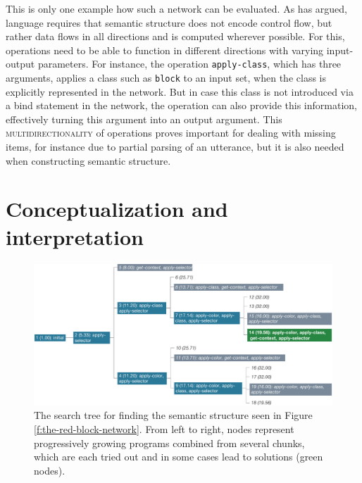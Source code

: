 This is only one example how such a network can be evaluated. 
As \cite{steels2000emergence} has argued,
language requires that semantic structure does not encode control flow, but rather 
data flows in all directions and is computed wherever possible.
For this, operations need to be able to function in different directions with
varying input-output parameters.
For instance, the operation {\footnotesize\tt apply-class}, which has three arguments, 
applies a class such as {\footnotesize\tt block} to an input set, when the 
class is explicitly represented in the network. But in case
this class is not introduced via a bind statement in the network, the operation
can also provide this information, effectively turning this argument
into an output argument. This \textsc{multidirectionality} of operations 
proves important for dealing with missing items, for instance due to partial parsing 
of an utterance, but it is also needed when constructing semantic structure.


\section{Conceptualization and interpretation}
\begin{figure}
\center
\includegraphics[width=1.0\columnwidth]{figs/composition}
\caption[IRL conceptualization search tree]{The search tree 
for finding the semantic structure seen in 
Figure \ref{f:the-red-block-network}. From left to right, nodes 
represent progressively growing programs combined from 
several chunks, which are each tried out and in some cases 
lead to solutions (green nodes).}
\label{f:the-red-block-search-tree}
\end{figure}

